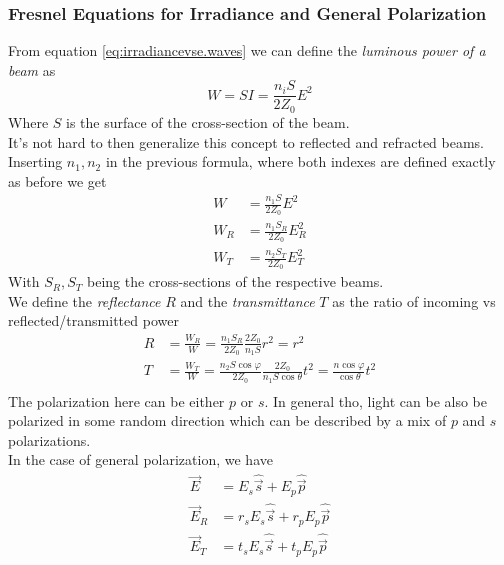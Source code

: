\documentclass[../electromagnetism.tex]{subfiles}
\begin{document}
\subsubsection{Fresnel Equations for Irradiance and General Polarization}
From equation \eqref{eq:irradiancevse.waves} we can define the \textit{luminous power of a beam} as 
\begin{equation}
	W=SI=\frac{n_iS}{2Z_0}E^2
	\label{eq:lumpower.ref}
\end{equation}
Where $S$ is the surface of the cross-section of the beam.\\
It's not hard to then generalize this concept to reflected and refracted beams. Inserting $n_1, n_2$ in the previous formula, where both indexes are defined exactly as before we get
\begin{equation*}
	\begin{aligned}
		W&= \frac{n_1S}{2Z_0}E^2\\
		W_R&= \frac{n_1S_R}{2Z_0}E_R^2\\
		W_T&= \frac{n_2S_T}{2Z_0}E_T^2
	\end{aligned}
\end{equation*}
With $S_R, S_T$ being the cross-sections of the respective beams.\\
We define the \textit{reflectance} $R$ and the \textit{transmittance} $T$ as the ratio of incoming vs reflected/transmitted power
\begin{equation}
	\begin{aligned}
		R&= \frac{W_R}{W}=\frac{n_1S_R}{2Z_0}\frac{2Z_0}{n_1S}r^2=r^2\\
		T&= \frac{W_T}{W}=\frac{n_2S\cos\varphi}{2Z_0}\frac{2Z_0}{n_1S\cos\theta}t^2=\frac{n\cos\varphi}{\cos\theta}t^2\\
	\end{aligned}
	\label{eq:RT.ref}
\end{equation}
The polarization here can be either $p$ or $s$. In general tho, light can be also be polarized in some random direction which can be described by a mix of $p$ and $s$ polarizations.\\
In the case of general polarization, we have
\begin{equation*}
	\begin{aligned}
		\vec{E}&= E_s\hat{\vec{s}}+E_p\hat{\vec{p}}\\
		\vec{E}_R&= r_sE_s\hat{\vec{s}}+r_pE_p\hat{\vec{p}}\\
		\vec{E}_T&= t_sE_s\hat{\vec{s}}+t_pE_p\hat{\vec{p}}\\
	\end{aligned}
\end{equation*}
\end{document}
